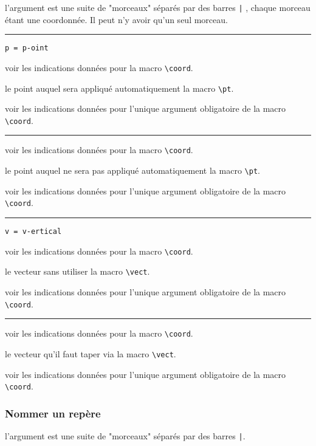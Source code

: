 \documentclass[12pt,a4paper]{article}
\theoremstyle{definition}
\newcommand\env[1]{\texttt{#1}}
\newcommand\macro[1]{\env{\textbackslash{}#1}}
\newcommand\separation{
    \medskip
    \hfill\rule{0.5\textwidth}{0.75pt}\hfill
    \medskip
}
\newcommand\mwhyprefix[2]{%
    \texttt{#1 = #1-#2}%
}
\begin{document}
\IDarg{} l'argument est une suite de "morceaux" séparés par des barres \verb+|+ , chaque morceau étant une coordonnée. Il peut n'y avoir qu'un seul morceau.


\separation


  \hfill \mwhyprefix{p}{oint}

\IDoption{} voir les indications données pour la macro \macro{coord}.

 le point auquel sera appliqué automatiquement la macro \macro{pt}.

 voir les indications données pour l'unique argument obligatoire de la macro \macro{coord}.


\separation



\IDoption{} voir les indications données pour la macro \macro{coord}.

 le point auquel ne sera pas appliqué automatiquement la macro \macro{pt}.

 voir les indications données pour l'unique argument obligatoire de la macro \macro{coord}.


\separation


 \hfill \mwhyprefix{v}{ertical}

\IDoption{} voir les indications données pour la macro \macro{coord}.

 le vecteur sans utiliser la macro \macro{vect}.

 voir les indications données pour l'unique argument obligatoire de la macro \macro{coord}.


\separation



\IDoption{} voir les indications données pour la macro \macro{coord}.

 le vecteur qu'il faut taper via la macro \macro{vect}.

 voir les indications données pour l'unique argument obligatoire de la macro \macro{coord}.


\subsubsection{Nommer un repère}





\IDarg{} l'argument est une suite de "morceaux" séparés par des barres \verb+|+.
\end{document}
